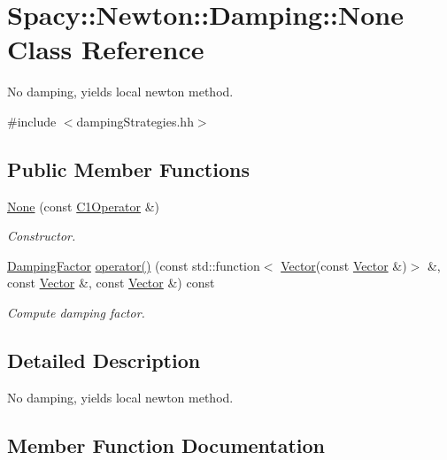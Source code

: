 \hypertarget{classSpacy_1_1Newton_1_1Damping_1_1None}{}\section{Spacy\+:\+:Newton\+:\+:Damping\+:\+:None Class Reference}
\label{classSpacy_1_1Newton_1_1Damping_1_1None}


No damping, yields local newton method.  




{\ttfamily \#include $<$damping\+Strategies.\+hh$>$}

\subsection*{Public Member Functions}
\begin{DoxyCompactItemize}
\item 
\hypertarget{classSpacy_1_1Newton_1_1Damping_1_1None_ac153c7288c074756c6c3eeb8f91eddd4}{}\hyperlink{classSpacy_1_1Newton_1_1Damping_1_1None_ac153c7288c074756c6c3eeb8f91eddd4}{None} (const \hyperlink{classSpacy_1_1C1Operator}{C1\+Operator} \&)\label{classSpacy_1_1Newton_1_1Damping_1_1None_ac153c7288c074756c6c3eeb8f91eddd4}

\begin{DoxyCompactList}\small\item\em Constructor. \end{DoxyCompactList}\item 
\hyperlink{classSpacy_1_1DampingFactor}{Damping\+Factor} \hyperlink{classSpacy_1_1Newton_1_1Damping_1_1None_a79351f9d5d55c598f6723aa0e5ff8ff3}{operator()} (const std\+::function$<$ \hyperlink{classSpacy_1_1Vector}{Vector}(const \hyperlink{classSpacy_1_1Vector}{Vector} \&)$>$ \&, const \hyperlink{classSpacy_1_1Vector}{Vector} \&, const \hyperlink{classSpacy_1_1Vector}{Vector} \&) const 
\begin{DoxyCompactList}\small\item\em Compute damping factor. \end{DoxyCompactList}\end{DoxyCompactItemize}


\subsection{Detailed Description}
No damping, yields local newton method. 

\subsection{Member Function Documentation}
\hypertarget{classSpacy_1_1Newton_1_1Damping_1_1None_a79351f9d5d55c598f6723aa0e5ff8ff3}{}
